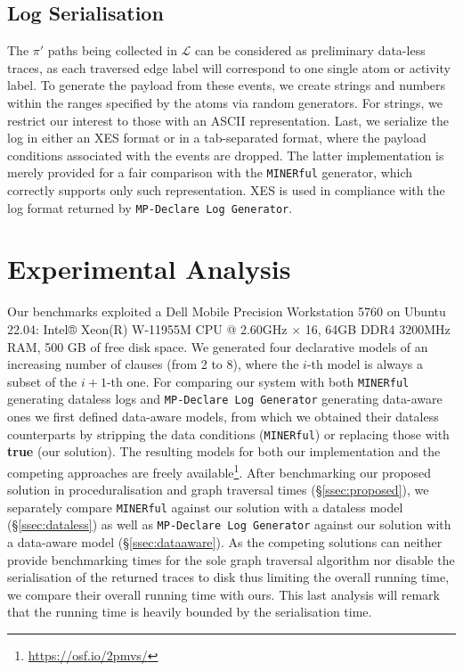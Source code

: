 \documentclass[sigconf]{acmart}
\begin{document}
\subsection{Log Serialisation}\label{sec:loggen}
The $\pi'$ paths being collected in $\mathcal{L}$ can be considered as preliminary data-less traces, as each traversed edge label will correspond to one single atom or activity label. 
To generate the payload from these events, we create strings and numbers within the ranges specified by the atoms via random generators. For strings, we restrict our interest to those with an ASCII representation. Last, we serialize the log in either an XES format or in a tab-separated format, where the payload conditions associated with the events are dropped. The latter implementation is merely provided for a fair comparison with the \texttt{MINERful} generator, which correctly supports only such representation. XES is used in compliance with the log format returned by \texttt{MP-Declare Log Generator}.

\section{Experimental Analysis}\label{sec:exp}
Our benchmarks exploited a Dell Mobile Precision Workstation 5760 on Ubuntu 22.04: Intel® Xeon(R) W-11955M CPU @ 2.60GHz $\times$ 16, 64GB DDR4 3200MHz RAM, 500 GB of free disk space. We generated four declarative models of an increasing number of clauses (from 2 to 8), where the $i$-th model is always a subset of the $i+1$-th one. For comparing our system with both \texttt{MINERful} generating dataless logs and
\texttt{MP-Declare Log Generator} generating data-aware ones we first defined 
data-aware models, from which we obtained their dataless counterparts by stripping the data conditions (\texttt{MINERful}) or replacing those with \textbf{true} (our solution). The resulting models for both our implementation and the competing approaches are freely available\footnote{\url{https://osf.io/2pmvs/}}. After benchmarking our proposed solution in proceduralisation and graph traversal times (\S\ref{ssec:proposed}), we separately compare \texttt{MINERful} against our solution with a dataless model (\S\ref{ssec:dataless}) as well as \texttt{MP-Declare Log Generator} against our solution with a data-aware model (\S\ref{ssec:dataaware}). As the competing solutions can neither provide benchmarking times for the sole graph traversal algorithm nor disable the serialisation of the returned traces to disk thus limiting the overall running time, we compare their overall running time with ours. This last analysis will remark that the running time is heavily bounded by the serialisation time.
\end{document}
